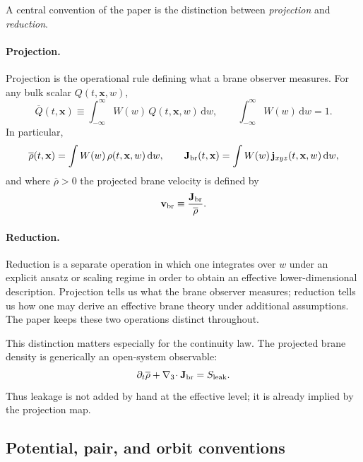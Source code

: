 \documentclass[11pt]{article}
\newcommand{\dd}{\mathrm d}
\newcommand{\x}{\mathbf x}
\newcommand{\gradThree}{\nabla_3}
\newcommand{\Wproj}{W}
\newcommand{\Proj}[1]{\overline{#1}}
\newcommand{\Sleak}{S_{\mathrm{leak}}}
\begin{document}
A central convention of the paper is the distinction between \emph{projection} and
\emph{reduction}.

\paragraph{Projection.}
Projection is the operational rule defining what a brane observer measures. For any bulk
scalar \(Q(t,\x,w)\),
\begin{equation}
\Proj{Q}(t,\x)
\equiv
\int_{-\infty}^{\infty}\Wproj(w)\,Q(t,\x,w)\,\dd w,
\qquad
\int_{-\infty}^{\infty}\Wproj(w)\,\dd w=1.
\label{eq:notation-projection}
\end{equation}
In particular,
\begin{equation}
\Proj{\rho}(t,\x)
=
\int \Wproj(w)\,\rho(t,\x,w)\,\dd w,
\qquad
\mathbf J_{\rm br}(t,\x)
=
\int \Wproj(w)\,\mathbf j_{xyz}(t,\x,w)\,\dd w,
\label{eq:notation-projected-density-current}
\end{equation}
and where \(\Proj{\rho}>0\) the projected brane velocity is defined by
\begin{equation}
\mathbf v_{\rm br}
\equiv
\frac{\mathbf J_{\rm br}}{\Proj{\rho}}.
\label{eq:notation-vbrane}
\end{equation}

\paragraph{Reduction.}
Reduction is a separate operation in which one integrates over \(w\) under an explicit
ansatz or scaling regime in order to obtain an effective lower-dimensional description.
Projection tells us what the brane observer measures; reduction tells us how one may
derive an effective brane theory under additional assumptions. The paper keeps these two
operations distinct throughout.

This distinction matters especially for the continuity law. The projected brane density is
generically an open-system observable:
\begin{equation}
\partial_t\Proj{\rho}
+
\gradThree\!\cdot\mathbf J_{\rm br}
=
\Sleak.
\label{eq:notation-open-continuity}
\end{equation}
Thus leakage is not added by hand at the effective level; it is already implied by the
projection map.

\subsection{Potential, pair, and orbit conventions}
\label{app:notation-potentials}
\end{document}
